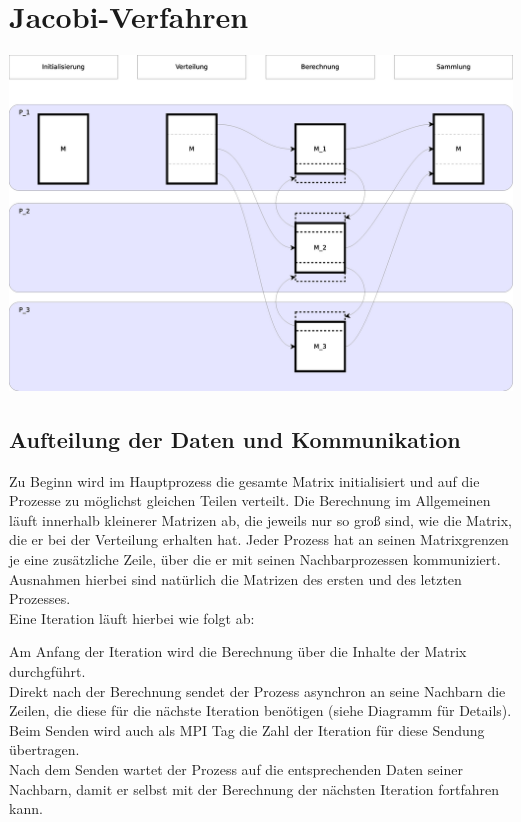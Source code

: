 \documentclass[a4paper]{scrartcl}
\title{\titleinfo}
\author{Sönke Kracht, Sven-Hendrik Haase}
\date{\today}
\begin{document}
\maketitle
\notag

\section{Jacobi-Verfahren}
\includegraphics[scale=0.3]{Jacobi.eps}

\subsection{Aufteilung der Daten und Kommunikation}
Zu Beginn wird im Hauptprozess die gesamte Matrix initialisiert und auf die
Prozesse zu möglichst gleichen Teilen verteilt. Die Berechnung im Allgemeinen 
läuft innerhalb kleinerer Matrizen ab, die jeweils nur so groß sind, wie die 
Matrix, die er bei der Verteilung erhalten hat.
Jeder Prozess hat an seinen Matrixgrenzen je eine zusätzliche Zeile, über die
er mit seinen Nachbarprozessen kommuniziert. Ausnahmen hierbei sind natürlich
die Matrizen des ersten und des letzten Prozesses.\\
Eine Iteration läuft hierbei wie folgt ab:

Am Anfang der Iteration wird die Berechnung über die Inhalte der Matrix 
durchgführt. \\
Direkt nach der Berechnung sendet der Prozess asynchron an seine
Nachbarn die Zeilen, die diese für die nächste Iteration benötigen
(siehe Diagramm für Details). Beim Senden wird auch als MPI Tag die Zahl der
Iteration für diese Sendung übertragen.\\
Nach dem Senden wartet der Prozess auf 
die entsprechenden Daten seiner Nachbarn, damit er selbst mit der Berechnung 
der nächsten Iteration fortfahren kann.
\end{document}
